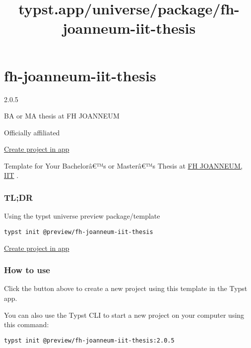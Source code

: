 \title{typst.app/universe/package/fh-joanneum-iit-thesis}

\label{banner}
\label{template-thumbnail}

\section{fh-joanneum-iit-thesis}\label{fh-joanneum-iit-thesis}

{ 2.0.5 }

BA or MA thesis at FH JOANNEUM

{ } Officially affiliated

\href{/app?template=fh-joanneum-iit-thesis&version=2.0.5}{Create project
in app}

\label{readme}
Template for Your Bachelorâ€™s or Masterâ€™s Thesis at
\href{http://www.fh-joanneum.at/iit}{FH JOANNEUM, IIT} .

\subsubsection{TL;DR}\label{tldr}

Using the typst universe preview package/template

\begin{verbatim}
typst init @preview/fh-joanneum-iit-thesis
\end{verbatim}


\href{/app?template=fh-joanneum-iit-thesis&version=2.0.5}{Create project
in app}

\subsubsection{How to use}\label{how-to-use}

Click the button above to create a new project using this template in
the Typst app.

You can also use the Typst CLI to start a new project on your computer
using this command:

\begin{verbatim}
typst init @preview/fh-joanneum-iit-thesis:2.0.5
\end{verbatim}

